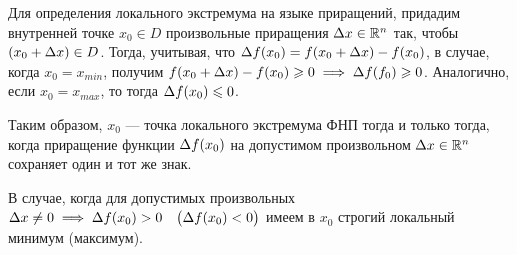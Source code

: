 \documentclass[../../main.tex]{subfiles}
\begin{document}
	Для определения локального экстремума на языке приращений,
	придадим внутренней точке $x_0 \in D$
	произвольные приращения $\Delta x \in \mathbb{R}^n$ так,
	чтобы $(x_0 + \Delta x) \in D$.
	Тогда, учитывая, что $\Delta f (x_0)
	= f (x_0 + \Delta x) - f (x_0)$,
	в случае, когда $x_0 = x_{min}$, получим
	$f (x_0 + \Delta x) - f (x_0) \geqslant 0
	\implies
	\Delta f (f_0) \geqslant 0$.
	Аналогично, если $x_0 = x_{max}$,
	то тогда $\Delta f (x_0) \leqslant 0$.

	Таким образом, $x_0$ --- точка локального экстремума ФНП
	тогда и только тогда, когда
	приращение функции $\Delta f (x_0)$ на допустимом
	произвольном $\Delta x \in \mathbb{R}^n$ сохраняет один и тот же знак.
	
	В случае, когда для допустимых произвольных $\Delta x \ne 0 \implies
	\Delta f (x_0) > 0 \displaystyle
	\quad \big(\Delta f (x_0) < 0\big)$
	имеем в $x_0$ строгий локальный минимум (максимум).
	
\end{document}
